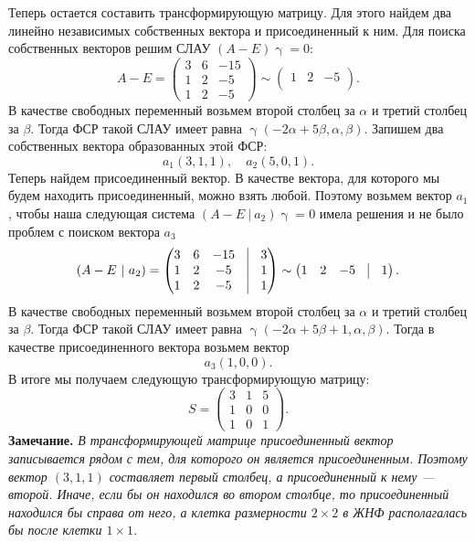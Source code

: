 \documentclass[a4paper, 12pt]{article}
\begin{document}
Теперь остается составить трансформирующую матрицу. Для этого найдем два линейно независимых собственных вектора и присоединенный к ним. Для поиска собственных векторов решим СЛАУ $(A-E)\upgamma = 0$:
$$A - E = \begin{pmatrix}
	3 & 6 & -15\\
	1 & 2 & -5\\
	1 & 2 & -5
\end{pmatrix} \sim \begin{pmatrix}
1 & 2 & -5\\
\end{pmatrix}.$$
В качестве свободных переменный возьмем второй столбец за $\alpha$ и третий столбец за $\beta$. Тогда ФСР такой СЛАУ имеет равна $\upgamma(-2\alpha + 5 \beta, \alpha, \beta)$. Запишем два собственных вектора образованных этой ФСР: $$a_1(3,1,1),\quad a_2(5,0,1).$$
Теперь найдем присоединенный вектор. В качестве вектора, для которого мы будем находить присоединенный, можно взять любой. Поэтому возьмем вектор $a_1$, чтобы наша следующая система $(A-E\ |\ a_2) \upgamma = 0$ имела решения и не было проблем с поиском вектора $a_3$
$$(A-E\ |\ a_2) = \begin{pmatrix}
	3 & 6 & -15 & \vline & 3\\
	1 & 2 & -5& \vline & 1\\
	1 & 2 & -5& \vline & 1
\end{pmatrix}\sim \begin{pmatrix}
1 & 2 & -5& \vline & 1
\end{pmatrix}.$$
В качестве свободных переменный возьмем второй столбец за $\alpha$ и третий столбец за $\beta$. Тогда ФСР такой СЛАУ имеет равна $\upgamma(-2\alpha + 5 \beta + 1, \alpha, \beta)$. Тогда в качестве присоединенного вектора возьмем вектор $$a_3(1,0,0).$$ В итоге мы получаем следующую трансформирующую матрицу: $$S = \begin{pmatrix}
	3 & 1 & 5\\
	1 & 0 & 0\\
	1 & 0 & 1
\end{pmatrix}.$$
\textbf{Замечание.} \textit{В трансформирующей матрице присоединенный вектор записывается рядом с тем, для которого он является присоединенным. Поэтому вектор $(3,1,1)$ составляет первый столбец, а присоединенный к нему --- второй. Иначе, если бы он находился во втором столбце, то присоединенный находился бы справа от него, а клетка размерности $2\times2$ в ЖНФ располагалась бы после клетки $1\times1$.}\\\\
\end{document}

